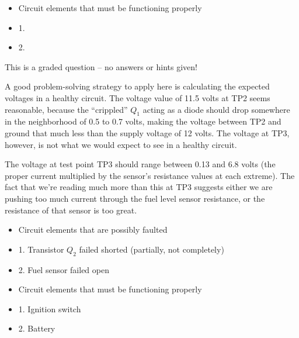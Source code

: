 \begin{itemize}
\goodbreak
\item{} Circuit elements that must be functioning properly
\item{1.} 
\item{2.} 
\end{itemize}

\vfil 

\eject






This is a graded question -- no answers or hints given!







A good problem-solving strategy to apply here is calculating the expected voltages in a healthy circuit.  The voltage value of 11.5 volts at TP2 seems reasonable, because the ``crippled'' $Q_1$ acting as a diode should drop somewhere in the neighborhood of 0.5 to 0.7 volts, making the voltage between TP2 and ground that much less than the supply voltage of 12 volts.  The voltage at TP3, however, is not what we would expect to see in a healthy circuit.

\vskip 10pt

The voltage at test point TP3 should range between 0.13 and 6.8 volts (the proper current multiplied by the sensor's resistance values at each extreme).  The fact that we're reading much more than this at TP3 suggests either we are pushing too much current through the fuel level sensor resistance, or the resistance of that sensor is too great.

\begin{itemize}
\item{} Circuit elements that are possibly faulted
\item{1.} Transistor $Q_2$ failed shorted (partially, not completely)
\item{2.} Fuel sensor failed open
\end{itemize}

\begin{itemize}
\item{} Circuit elements that must be functioning properly
\item{1.} Ignition switch
\item{2.} Battery
\end{itemize}




